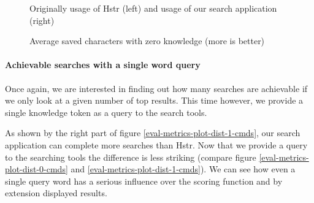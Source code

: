 \begin{figure}
\centering
{}\hfill
{}
\caption{Average saved characters with zero knowledge (more is better)}
\small{Originally usage of Hstr (left) and usage of our search application (right)}
\label{eval-metrics-plot-dist-0-chars}
\end{figure}


\newpage
\paragraph{Achievable searches with a single word query}

Once again, we are interested in finding out how many searches are achievable if we only look at a given number of top results. This time however, we provide a single knowledge token as a query to the search tools.

As shown by the right part of figure \ref{eval-metrics-plot-dist-1-cmds}, our search application can complete more searches than Hstr. Now that we provide a query to the searching tools the difference is less striking (compare figure \ref{eval-metrics-plot-dist-0-cmds} and \ref{eval-metrics-plot-dist-1-cmds}). We can see how even a single query word has a serious influence over the scoring function and by extension displayed results. 

